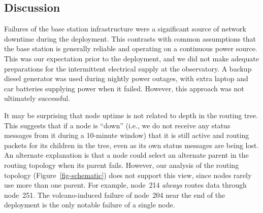 \subsection{Discussion}

Failures of the base station infrastructure were a significant
source of network downtime during the deployment.  This contrasts with 
common assumptions
that the base station is generally reliable and operating on a continuous
power source. This was our expectation prior to the deployment, and we did
not make adequate preparations for the intermittent electrical supply at the
observatory. A backup diesel generator was used during nightly power outages,
with extra laptop and car batteries supplying power when it failed.  However,
this approach was not ultimately successful.

It may be surprising that node uptime is not related to depth in the
routing tree. This suggests that if a node is ``down'' (i.e., we do
not receive any status messages from it during a 10-minute window)
that it is still active and routing packets for its children in the
tree, even as its own status messages are being lost. An alternate
explanation is that a node could select an alternate parent in the
routing topology when its parent fails. However, our analysis of the
routing topology (Figure~\ref{fig-schematic}) does not support this
view, since nodes rarely use more than one parent. For example,
node~214 {\em always} routes data through node~251. The
volcano-induced failure of node~204 near the end of the deployment
is the only notable failure of a single node.

